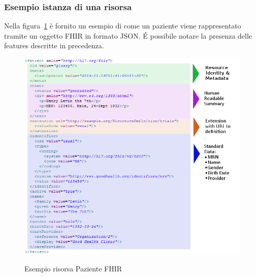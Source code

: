 \documentclass[a4paper]{article}
\begin{document}
\subsubsection*{Esempio istanza di una risorsa}
Nella figura~\ref{fig:esempioPaziente} è fornito un esempio di come un paziente viene rappresentato tramite un oggetto FHIR in formato JSON.
\'E possibile notare la presenza delle features descritte in precedenza.
\begin{figure}[H]
    \centering
    \includegraphics[width=1 \textwidth]{figures/esempio paziente.png}
    \label{fig:esempioPaziente}
    \caption{Esempio risorsa Paziente FHIR}
\end{figure}
\end{document}
